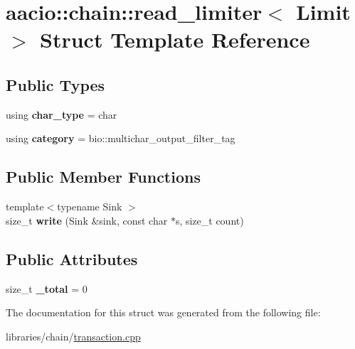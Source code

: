 \hypertarget{structaacio_1_1chain_1_1read__limiter}{}\section{aacio\+:\+:chain\+:\+:read\+\_\+limiter$<$ Limit $>$ Struct Template Reference}
\label{structaacio_1_1chain_1_1read__limiter}
\subsection*{Public Types}
\begin{DoxyCompactItemize}
\item 
\mbox{\label{structaacio_1_1chain_1_1read__limiter_aa0ad41b4ecb5c7ce203844e4a41d2fd4}} 
using {\bfseries char\+\_\+type} = char
\item 
\mbox{\label{structaacio_1_1chain_1_1read__limiter_a2598049dc39dd85241277037bac9572f}} 
using {\bfseries category} = bio\+::multichar\+\_\+output\+\_\+filter\+\_\+tag
\end{DoxyCompactItemize}
\subsection*{Public Member Functions}
\begin{DoxyCompactItemize}
\item 
\mbox{\label{structaacio_1_1chain_1_1read__limiter_ae1110c5e33badc37ccce905c2e533261}} 
{\footnotesize template$<$typename Sink $>$ }\\size\+\_\+t {\bfseries write} (Sink \&sink, const char $\ast$s, size\+\_\+t count)
\end{DoxyCompactItemize}
\subsection*{Public Attributes}
\begin{DoxyCompactItemize}
\item 
\mbox{\label{structaacio_1_1chain_1_1read__limiter_a60839388a3e687b713c1556d72851b4c}} 
size\+\_\+t {\bfseries \+\_\+total} = 0
\end{DoxyCompactItemize}


The documentation for this struct was generated from the following file\+:\begin{DoxyCompactItemize}
\item 
libraries/chain/\mbox{\hyperlink{transaction_8cpp}{transaction.\+cpp}}\end{DoxyCompactItemize}
